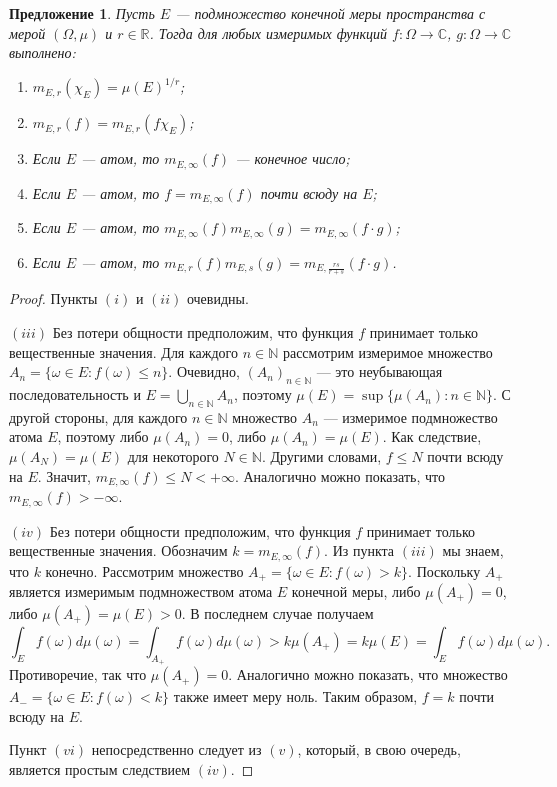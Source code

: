 \documentclass[12pt]{article}
\newtheorem{proposition}[theorem]{Предложение}
\begin{document}
\begin{proposition}\label{GnrlzdMeanProp}
    Пусть $E$ --- подмножество конечной меры пространства с мерой $(\Omega,\mu)$ 
    и $r\in\mathbb{R}$. Тогда для любых измеримых 
    функций $f:\Omega\to\mathbb{C}$, $g:\Omega\to\mathbb{C}$ выполнено:
    \begin{enumerate}[label = (\roman*)]
        \item $m_{E,r}(\chi_E)=\mu(E)^{1/r}$;
        \item $m_{E,r}(f)=m_{E,r}(f\chi_E)$;
        \item Если $E$ --- атом, то $m_{E,\infty}(f)$ --- конечное число;
        \item Если $E$ --- атом, то $f=m_{E,\infty}(f)$ почти всюду на $E$;
        \item Если $E$ --- атом, 
        то $m_{E,\infty}(f)m_{E,\infty}(g)=m_{E,\infty}(f\cdot g)$;
        \item Если $E$ --- атом, 
        то $m_{E,r}(f)m_{E,s}(g)=m_{E,\frac{rs}{r+s}}(f\cdot g)$.
    \end{enumerate}
\end{proposition}
\begin{proof}
    Пункты $(i)$ и $(ii)$ очевидны.

    $(iii)$ Без потери общности предположим, что функция $f$ принимает только 
    вещественные значения. Для каждого $n\in\mathbb{N}$ рассмотрим измеримое 
    множество $A_n=\{\omega\in E:f(\omega)\leq n\}$. Очевидно, 
    $(A_n)_{n\in\mathbb{N}}$ --- это неубывающая последовательность
    и $E=\bigcup_{n\in\mathbb{N}}A_n$, 
    поэтому $\mu(E)=\sup\{\mu(A_n):n\in\mathbb{N}\}$. С другой стороны, для 
    каждого $n\in\mathbb{N}$ множество $A_n$ --- измеримое подмножество 
    атома $E$, поэтому либо $\mu(A_n)=0$, либо $\mu(A_n)=\mu(E)$. 
    Как следствие, $\mu(A_N)=\mu(E)$ для некоторого $N\in\mathbb{N}$. 
    Другими словами, $f\leq N$ почти всюду на $E$.
    Значит, $m_{E,\infty}(f)\leq N<+\infty$. Аналогично можно показать, 
    что $m_{E,\infty}(f)>-\infty$.

    $(iv)$ Без потери общности предположим, что функция $f$ принимает только 
    вещественные значения. Обозначим $k=m_{E,\infty}(f)$. Из пункта $(iii)$ мы 
    знаем, что $k$ конечно. Рассмотрим 
    множество $A_+=\{\omega\in E: f(\omega)>k\}$. Поскольку $A_+$ является 
    измеримым подмножеством атома $E$ конечной меры, либо $\mu(A_+)=0$, 
    либо $\mu(A_+)=\mu(E)>0$. В последнем случае получаем
    \[
        \int_E f(\omega)d\mu(\omega)
        =\int_{A_+}f(\omega)d\mu(\omega)
        >k\mu(A_+)
        =k\mu(E)
        =\int_E f(\omega)d\mu(\omega).
    \]
    Противоречие, так что $\mu(A_+)=0$. Аналогично можно показать, что 
    множество $A_-=\{\omega\in E:f(\omega)<k\}$ также имеет меру ноль. 
    Таким образом, $f=k$ почти всюду на $E$.

    Пункт $(vi)$ непосредственно следует из $(v)$, который, в свою очередь, 
    является простым следствием $(iv)$.
\end{proof}
\end{document}
